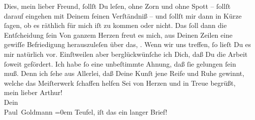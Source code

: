 \begin{ledgroupsized}[t]{13cm}
           \pstart
           Dies, mein lieber Freund, ſollſt Du leſen, ohne Zorn und ohne Spott – ſollſt darauf
               eingehen mit Deinem feinen Verſtändniß – und ſollſt mir dann in Kürze ſagen, \strikeout{\textcolor{gray}{×}\-\textcolor{gray}{×}\-\textcolor{gray}{×}\-\textcolor{gray}{×}\-\textcolor{gray}{×}} ob
                   es räthlich für mich iſt zu kommen oder nicht.
               Das ſoll dann die Entſcheidung ſein{\dotsfour}\pend
           \pstart
           Von ganzem Herzen freut es mich, aus Deinen Zeilen eine gewiſſe Befriedigung
               herauszuleſen über das, \label{K_L02608-4v}\label{K_L02608-4h}. Wenn
               wir uns treffen, ſo lieſt Du es mir {\pb}natürlich vor.
               Einſtweilen aber berglückwünſche ich Dich, daß Du die Arbeit ſoweit gefördert. Ich
               habe ſo eine unbeſtimmte Ahnung, daß ſie gelungen ſein muß. Denn ich ſehe aus
               Allerlei, daß Deine Kunſt jene Reife und Ruhe gewinnt, welche das Meiſterwerk
               ſchaffen helfen{\dotsfour}\pend
           \pstart
           Sei von Herzen und in Treue begrüßt, mein lieber Arthur!{\\[\baselineskip]} Dein{\\[\baselineskip]}\spacefill\mbox{Paul Goldmann}\pend
           \leftskip=0em{}\pstart
           \noindent{}Teufel, iſt das ein langer Brief!\pend
           \endnumbering{}\end{ledgroupsized}  \newcommand{\dateiname}{L02608}\newcommand{\titel}{Paul Goldmann an Arthur Schnitzler, 29. 7. [1894]}\newcommand{\editorInnen}{Martin Anton Müller und Laura Untner}
            \footnotesize
\begin{ledgroupsized}[t]{11.5cm}
\end{ledgroupsized}
         
      